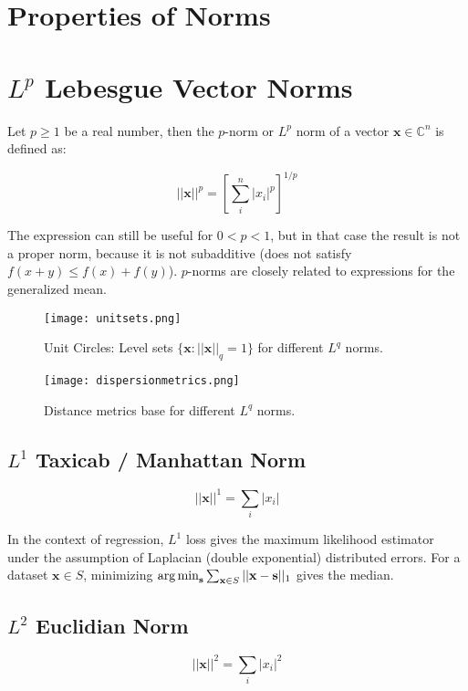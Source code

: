 \section{Properties of Norms}

\section{$L^p$ Lebesgue Vector Norms}
\label{sec:lpnorms}

Let $p\geq1$ be a real number, then the $p$-norm or $L^p$ norm of a vector $\mathbf{x}\in\mathbb{C}^n$ is defined as:

\begin{equation}
||\mathbf{x}||^p = \left[ \sum^n_i |x_i|^p \right]^{1/p}
\end{equation}

The expression can still be useful for $0<p<1$, but in that case the result is not a proper norm, because it is not subadditive (does not satisfy $f(x+y) \leq f(x) + f(y)$). $p$-norms are closely related to expressions for the generalized mean.


\begin{figure}
\centering
    \texttt{[image: unitsets.png]}
    \caption{Unit Circles: Level sets $\{\mathbf{x}: ||\mathbf{x}||_q = 1\}$ for different $L^q$ norms.}
    \label{fig:unitsets}
\end{figure}

\begin{figure}
\centering
    \texttt{[image: dispersionmetrics.png]}
    \caption{Distance metrics base for different $L^q$ norms.}
    \label{fig:unitsets}
\end{figure}


\subsection{$L^{1}$ Taxicab / Manhattan Norm}
\label{sec:l1norm}
\begin{equation}
||\mathbf{x}||^1 = \sum_i |x_i|
\end{equation}

In the context of regression, $L^1$ loss gives the maximum likelihood estimator under the assumption of Laplacian (double exponential) distributed errors. For a dataset $\mathbf{x}\in S$, minimizing $\operatorname*{arg\,min}_{\mathbf{s}} \sum_{\mathbf{x}\in S}||\mathbf{x}-\mathbf{s}||_{1}$ gives the median.


\subsection{$L^{2}$ Euclidian Norm}
\label{sec:l2norm}
\begin{equation}
||\mathbf{x}||^2 = \sum_i |x_i|^2
\end{equation}


